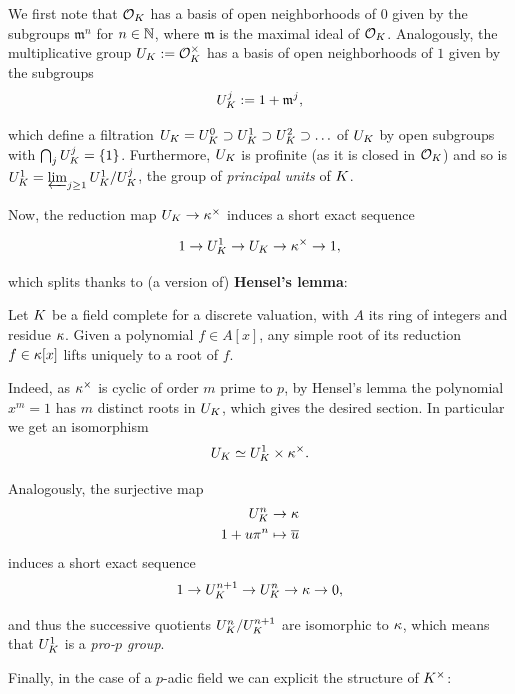 \documentclass[a4paper, oneside]{memoir}
\begin{document}
We first note that $\mathcal{O}_K$ has a basis of open neighborhoods of $0$ given by the subgroups $\mathfrak{m}^n$ for $n\in\mathbb{N}$, where $\mathfrak{m}$ is the maximal ideal of $\mathcal{O}_K$. Analogously, the multiplicative group $U_K:=\mathcal{O}_K^\times$ has a basis of open neighborhoods of $1$ given by the subgroups
\[
	U_K^j:=1+\mathfrak{m}^j,
\]

which define a filtration $U_K = U_K^0\supset U_K^1\supset U_K^2\supset\ldots$ of $U_K$ by open subgroups with $\bigcap_j{U_K^j}=\{1\}$. Furthermore, $U_K$ is profinite (as it is closed in $\mathcal{O}_K$) and so is $U_K^1=\varprojlim_{j\geq 1}{U_K^1 / U_K^j}$, the group of \textit{principal units} of $K$.

Now, the reduction map $U_K\to \kappa^\times$ induces a short exact sequence

\[
	1\to U_K^1\to U_K\to \kappa^\times \to 1,
\]

which splits thanks to (a version of) \textbf{Hensel's lemma}:

\begin{proposition}
	Let $K$ be a field complete for a discrete valuation, with $A$ its ring of integers and residue $\kappa$.
	Given a polynomial $f\in A[x]$, any simple root of its reduction $f\in \kappa[x]$ lifts uniquely to a root of $f$.
\end{proposition}

Indeed, as $\kappa^\times$ is cyclic of order $m$ prime to $p$, by Hensel's lemma the polynomial $x^m=1$ has $m$ distinct roots in $U_K$, which gives the desired section. In particular we get an isomorphism
\begin{equation}\label{eq:UK}
	U_K\simeq U_K^1\times\kappa^\times.
\end{equation}

Analogously, the surjective map
\begin{align*}
	U_K^n       & \to \kappa               \\
	1 + u \pi ^n & \mapsto \overline{u}
\end{align*}
induces a short exact sequence
\[
	1\to U_K^{n+1} \to U_K^n\to \kappa\to 0,
\]

and thus the successive quotients $U_K^n/U_K^{n+1}$ are isomorphic to $\kappa$, which means that $U_K^1$ is a \textit{pro-$p$ group}.

Finally, in the case of a $p$-adic field we can explicit the structure of $K^\times$:
\end{document}
